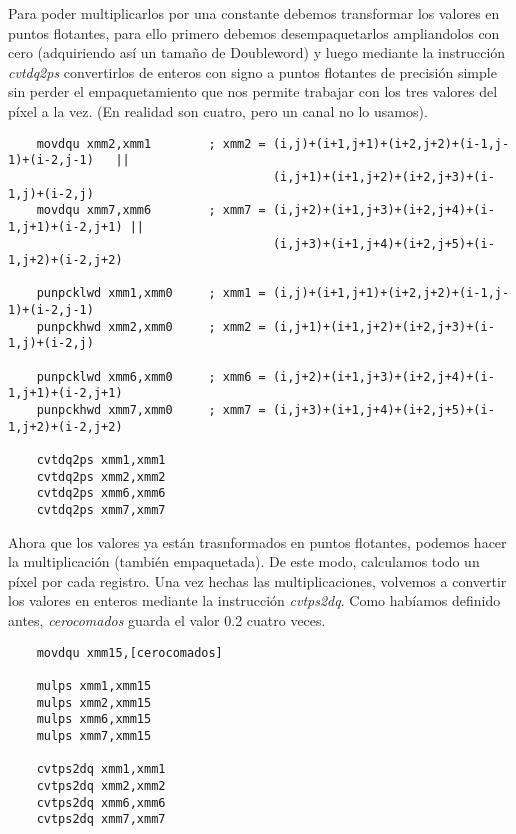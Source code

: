 \documentclass[a4paper]{article}
\begin{document}
\indent Para poder multiplicarlos por una constante debemos transformar los valores en puntos flotantes, para ello primero debemos desempaquetarlos ampliandolos con cero (adquiriendo as\'i un tama\~no de Doubleword) y luego mediante la instrucci\'on \textit{cvtdq2ps} convertirlos de enteros con signo a puntos flotantes de precisi\'on simple sin perder el empaquetamiento que nos permite trabajar con los tres valores del p\'ixel a la vez. (En realidad son cuatro, pero un canal no lo usamos).
 \begin{codesnippet}
\begin{verbatim}
    movdqu xmm2,xmm1        ; xmm2 = (i,j)+(i+1,j+1)+(i+2,j+2)+(i-1,j-1)+(i-2,j-1)   ||
                                     (i,j+1)+(i+1,j+2)+(i+2,j+3)+(i-1,j)+(i-2,j)
    movdqu xmm7,xmm6        ; xmm7 = (i,j+2)+(i+1,j+3)+(i+2,j+4)+(i-1,j+1)+(i-2,j+1) ||
                                     (i,j+3)+(i+1,j+4)+(i+2,j+5)+(i-1,j+2)+(i-2,j+2)

    punpcklwd xmm1,xmm0     ; xmm1 = (i,j)+(i+1,j+1)+(i+2,j+2)+(i-1,j-1)+(i-2,j-1)
    punpckhwd xmm2,xmm0     ; xmm2 = (i,j+1)+(i+1,j+2)+(i+2,j+3)+(i-1,j)+(i-2,j)

    punpcklwd xmm6,xmm0     ; xmm6 = (i,j+2)+(i+1,j+3)+(i+2,j+4)+(i-1,j+1)+(i-2,j+1)
    punpckhwd xmm7,xmm0     ; xmm7 = (i,j+3)+(i+1,j+4)+(i+2,j+5)+(i-1,j+2)+(i-2,j+2)

    cvtdq2ps xmm1,xmm1  
    cvtdq2ps xmm2,xmm2  
    cvtdq2ps xmm6,xmm6  
    cvtdq2ps xmm7,xmm7
\end{verbatim}
\end{codesnippet}

\indent Ahora que los valores ya est\'an trasnformados en puntos flotantes, podemos hacer la multiplicaci\'on (tambi\'en empaquetada). De este modo, calculamos todo un p\'ixel por cada registro. Una vez hechas las multiplicaciones, volvemos a convertir los valores en enteros mediante la instrucci\'on \textit{cvtps2dq}. Como hab\'iamos definido antes, \textit{cerocomados} guarda el valor 0.2 cuatro veces.

 \begin{codesnippet}
\begin{verbatim}
    movdqu xmm15,[cerocomados] 

    mulps xmm1,xmm15
    mulps xmm2,xmm15
    mulps xmm6,xmm15
    mulps xmm7,xmm15

    cvtps2dq xmm1,xmm1
    cvtps2dq xmm2,xmm2
    cvtps2dq xmm6,xmm6
    cvtps2dq xmm7,xmm7
\end{verbatim}
\end{codesnippet}
\newpage
\end{document}
